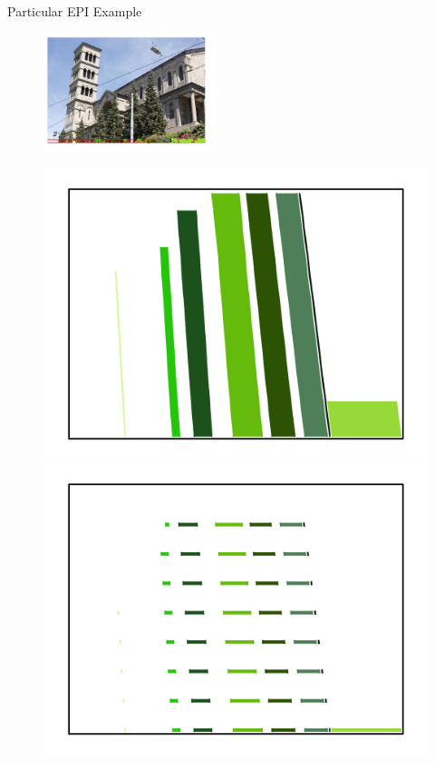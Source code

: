 \begin{frame}{Particular EPI Example}
\begin{figure}[h!]
\includegraphics[width=0.45\textwidth]{../../EPIs_strips/EPIs/673_10_102_4_48_8_strip.png}
\end{figure}
\pause
\begin{figure}[!tbp]
  \centering
  \begin{minipage}[b]{0.45\textwidth}
    \includegraphics[width=\textwidth]{../../EPIs_strips/EPIs/673_10_102_4_48_8_dense.png}
  \end{minipage}
	\pause
  \begin{minipage}[b]{0.45\textwidth}
    \includegraphics[width=\textwidth]{../../EPIs_strips/EPIs/673_10_102_4_48_8_sparse.png}
  \end{minipage}
\end{figure}

\end{frame}

